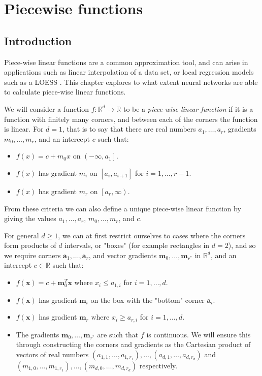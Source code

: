 \documentclass{somasmsc}
\begin{document}
\chapter{Piecewise functions}

\section{Introduction}

Piece-wise linear functions are a common approximation tool, and can arise in applications such as linear interpolation of a data set, or local regression models such as a LOESS \citep{cleveland1979robust}. This chapter explores to what extent neural networks are able to calculate piece-wise linear functions.

We will consider a function $f: \mathbb{R}^d \rightarrow \mathbb{R}$ to be a \textit{piece-wise linear function} if it is a function with finitely many corners, and between each of the corners the function is linear. For $d=1$, that is to say that there are real numbers $a_1, \dots, a_r$, gradients $m_0, \dots, m_r$, and an intercept $c$ such that:
\begin{itemize}
    \item $f\left(x\right) = c + m_0 x$ on $\left(-\infty, a_1\right]$.
    \item $f\left(x\right)$ has gradient $m_i$ on $\left[a_i, a_{i+1}\right]$ for $i=1, \dots, r-1$.
    \item $f\left(x\right)$ has gradient $m_r$ on $\left[a_r, \infty\right)$.
\end{itemize}
From these criteria we can also define a unique piece-wise linear function by giving the values $a_1, \dots, a_r$, $m_0, \dots, m_r$, and $c$.

For general $d \geq 1$, we can at first restrict ourselves to cases where the corners form products of $d$ intervals, or "boxes" (for example rectangles in $d=2$), and so we require corners $\pmb{a}_1, \dots, \pmb{a}_{r}$, and vector gradients $\pmb{m}_0, \dots, \pmb{m}_{r^*}$ in $\mathbb{R}^d$, and an intercept $c \in \mathbb{R}$ such that:
\begin{itemize}
    \item $f\left(\pmb{x}\right) = c + \pmb{m}_0^T \pmb{x}$ where $x_i \leq a_{1,i}$ for $i=1, \dots, d$.
    \item $f\left(\pmb{x}\right)$ has gradient $\pmb{m}_i$ on the box with the "bottom" corner $\pmb{a}_i$.
    \item $f\left(\pmb{x}\right)$ has gradient $\pmb{m}_r$ where $x_i \geq a_{r,i}$ for $i=1, \dots, d$.
    \item The gradients $\pmb{m}_0, \dots, \pmb{m}_{r^*}$ are such that $f$ is continuous. We will ensure this through constructing the corners and gradients as the Cartesian product of vectors of real numbers $\left(a_{1,1}, \dots, a_{1, r_1}\right), \dots, \left(a_{d, 1}, \dots, a_{d, r_d}\right)$ and $\left(m_{1,0}, \dots, m_{1, r_1}\right), \dots, \left(m_{d, 0}, \dots, m_{d, r_d}\right)$ respectively.
\end{itemize}
\end{document}
